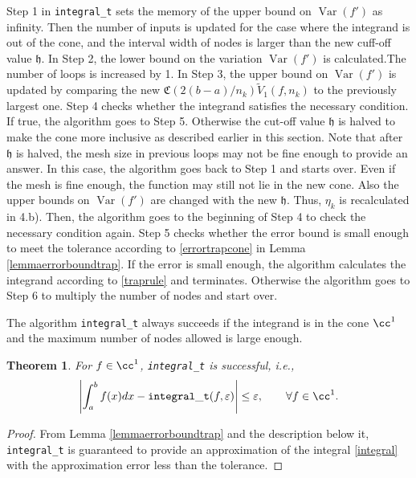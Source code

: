 \documentclass{iitthesis}
\DeclareMathOperator{\Var}{Var}
\newtheorem{theorem}{Theorem}
\theoremstyle{definition}
\theoremstyle{remark}
\begin{document}
Step 1 in {\tt integral\_t} sets the memory of the upper bound on $\Var(f')$ as infinity. Then the number of inputs is updated for the case where the integrand is out of the cone, and the interval width of nodes is larger than the new cuff-off value $\mathfrak{h}$. In Step 2, the lower bound on the variation $\Var(f')$ is calculated.The number of loops is increased by 1. In Step 3, the upper bound on $\Var(f')$ is updated by comparing the new $\mathfrak{C}(2(b-a)/n_{k})\widetilde{V}_1(f,n_k)$ to the previously largest one. Step 4 checks whether the integrand satisfies the necessary condition. If true, the algorithm goes to Step 5. Otherwise the cut-off value $\mathfrak{h}$ is halved to make the cone more inclusive as described earlier in this section. Note that after $\mathfrak{h}$ is halved, the mesh size in previous loops may not be fine enough to provide an answer. In this case, the algorithm goes back to Step 1 and starts over. Even if the mesh is fine enough, the function may still not lie in the new cone. Also the upper bounds on $\Var(f')$ are changed with the new $\mathfrak{h}$. Thus, $\eta_{k}$ is recalculated in 4.b). Then, the algorithm goes to the beginning of Step 4 to check the necessary condition again. Step 5 checks whether the error bound is small enough to meet the tolerance according to \eqref{errortrapcone} in Lemma \ref{lemmaerrorboundtrap}. If the error is small enough, the algorithm calculates the integrand according to \eqref{traprule} and terminates. Otherwise the algorithm goes to Step 6 to multiply the number of nodes and start over.

The algorithm {\tt integral\_t} always succeeds if the integrand is in the cone $\cc^1$ and the maximum number of nodes allowed is large enough.
\begin{theorem}\label{thmTrap}
    For $f \in \cc^1$, {\tt integral\_t} is successful, i.e.,
    \begin{equation*}
      \left|\int_{a}^{b}f(x)dx-{\tt integral\_t}(f,\varepsilon)\right|\le\varepsilon, \qquad \forall f\in \cc^1.
    \end{equation*}
\end{theorem}
\begin{proof}
  From Lemma \ref{lemmaerrorboundtrap} and the description below it, {\tt integral\_t} is guaranteed to provide an approximation of the integral \eqref{integral} with the approximation error less than the tolerance.
\end{proof}
\end{document}
